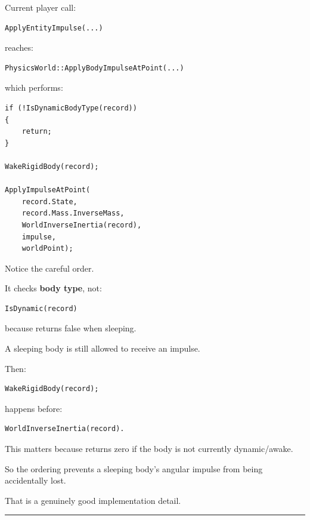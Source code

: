 \hypertarget{06-engine-ii-ch037-kairo-deep-audit-impulse-application-order}{}

Current player call:

\begin{verbatim}
ApplyEntityImpulse(...)
\end{verbatim}

reaches:

\begin{verbatim}
PhysicsWorld::ApplyBodyImpulseAtPoint(...)
\end{verbatim}

which performs:

\begin{verbatim}
if (!IsDynamicBodyType(record))
{
    return;
}

WakeRigidBody(record);

ApplyImpulseAtPoint(
    record.State,
    record.Mass.InverseMass,
    WorldInverseInertia(record),
    impulse,
    worldPoint);
\end{verbatim}

Notice the careful order.

It checks \textbf{body type}, not:

\begin{verbatim}
IsDynamic(record)
\end{verbatim}

because  returns false when sleeping.

A sleeping body is still allowed to receive an impulse.

Then:

\begin{verbatim}
WakeRigidBody(record);
\end{verbatim}

happens before:

\begin{verbatim}
WorldInverseInertia(record).
\end{verbatim}

This matters because  returns zero if the body is not currently dynamic/awake.

So the ordering prevents a sleeping body's angular impulse from being accidentally lost.

That is a genuinely good implementation detail.

\begin{center}\rule{0.5\linewidth}{0.5pt}\end{center}

